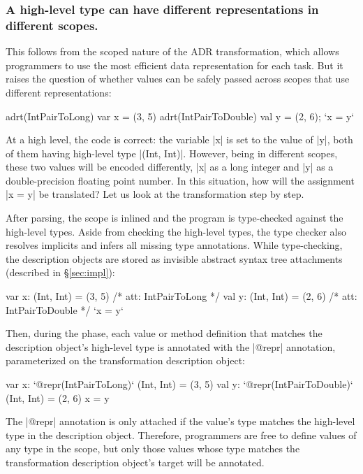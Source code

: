 \subsubsection*{A high-level type can have different representations in different scopes.} This follows from the scoped nature of the ADR transformation, which allows programmers to use the most efficient data representation for each task. But it raises the question of whether values can be safely passed across scopes that use different representations:

\begin{lstlisting-nobreak}
adrt(IntPairToLong)   { var x = (3, 5) }
adrt(IntPairToDouble) { val y = (2, 6); `x = y` }
\end{lstlisting-nobreak}

At a high level, the code is correct: the variable |x| is set to the value of |y|, both of them having high-level type |(Int, Int)|. However, being in different scopes, these two values will be encoded differently, |x| as a long integer and |y| as a double-precision floating point number. In this situation, how will the assignment |x = y| be translated? Let us look at the transformation step by step.

After parsing, the scope is inlined and the program is type-checked against the high-level types. Aside from checking the high-level types, the type checker also resolves implicits and infers all missing type annotations. While type-checking, the description objects are stored as invisible abstract syntax tree attachments (described in \S\ref{sec:impl}):

\begin{lstlisting-nobreak}
var x: (Int, Int) = (3, 5) /* att: IntPairToLong */
val y: (Int, Int) = (2, 6) /* att: IntPairToDouble */
`x = y`
\end{lstlisting-nobreak}

Then, during the \inject{} phase, each value or method definition that matches the description object's high-level type is annotated with the |@repr| annotation, parameterized on the transformation description object:

\begin{lstlisting-nobreak}
var x: `@repr(IntPairToLong)` (Int, Int) = (3, 5)
val y: `@repr(IntPairToDouble)` (Int, Int) = (2, 6)
x = y
\end{lstlisting-nobreak}

The |@repr| annotation is only attached if the value's type matches the high-level type in the description object. Therefore, programmers are free to define values of any type in the scope, but only those values whose type matches the transformation description object's target will be annotated.

